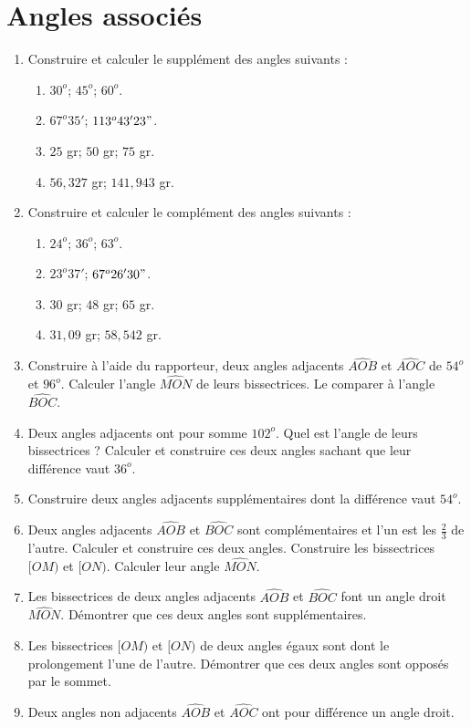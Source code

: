 \documentclass[12 pt]{report}
\theoremstyle{plain}
\newcounter{n}
\begin{document}
\chapter{Angles associés} 
\begin{enumerate}
\item Construire et calculer le supplément des angles suivants : 
\begin{enumerate}
\item $30^o$; $45^o$; $60^o$. 
\item $67^o35'$; $113^o43'23"$. 
\item $25$ gr; $50$ gr; $75$ gr. 
\item $56,327$ gr; $141,943$ gr. 
\end{enumerate}
\item Construire et calculer le complément des angles suivants : 
\begin{enumerate}
\item $24^o$; $36^o$; $63^o$. 
\item $23^o37'$; $67^o26'30"$.
\item $30$ gr; $48$ gr; $65$ gr. 
\item $31,09$ gr; $58,542$ gr. 
\end{enumerate}
\item Construire à l'aide du rapporteur, deux angles adjacents $\widehat{AOB}$ et $\widehat{AOC}$ de $54^o$ et $96^o$. Calculer l'angle $\widehat{MON}$ de leurs bissectrices. Le comparer à l'angle $\widehat{BOC}$.
\item Deux angles adjacents ont pour somme $102^o$. Quel est l'angle de leurs bissectrices ? Calculer et construire ces deux angles sachant que leur différence vaut $36^o$. 
\item Construire deux angles adjacents supplémentaires dont la différence vaut $54^o$. 
\item Deux angles adjacents $\widehat{AOB}$ et $\widehat{BOC}$ sont complémentaires et l'un est les $\frac23$ de l'autre. Calculer et construire ces deux angles. Construire les bissectrices $[OM)$ et $[ON)$. Calculer leur angle $\widehat{MON}$. 
\item Les bissectrices de deux angles adjacents $\widehat{AOB}$ et $\widehat{BOC}$ font un angle droit $\widehat{MON}$. Démontrer que ces deux angles sont supplémentaires. 
\item Les bissectrices $[OM)$ et $[ON)$ de deux angles égaux sont dont le prolongement l'une de l'autre. Démontrer que ces deux angles sont opposés par le sommet. 
\item Deux angles non adjacents $\widehat{AOB}$ et $\widehat{AOC}$ ont pour différence un angle droit. 

\end{enumerate}
\end{document}
